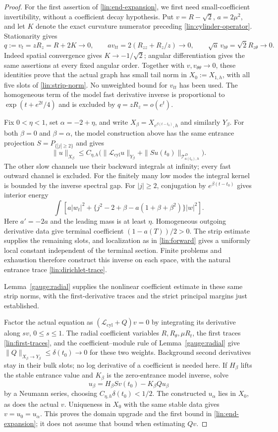 \begin{proof}
For the first assertion of \eqref{lin:end-expansion}, we first need
small-coefficient invertibility, without a coefficient decay hypothesis.
Put $v=R-\sqrt2$, $a=2\mu^2$, and let $K$ denote the exact curvature
numerator preceding \eqref{lin:cylinder-operator}.  Stationarity gives
\[
 q:=v_t=zR_z=R+2K\longrightarrow0,\qquad
 a v_{tt}=2(R_{zz}+R_z/z)\longrightarrow0,\qquad
 \sqrt a\,v_{t\theta}=\sqrt2R_{z\theta}\longrightarrow0.
\]
Indeed spatial convergence gives $K\to-1/\sqrt2$; angular
differentiation gives the same assertions at every fixed angular order.
Together with $v,v_{\theta\theta}\to0$, these identities prove that
the actual graph has small tail norm in $X_0:=X_{1,h}$, with all five
slots of \eqref{lin:strip-norm}.  No unweighted bound for $v_{tt}$
has been used.  The homogeneous term of the model fast derivative
inverse is proportional to $\exp(t+e^{2t}/4)$ and is excluded by
$q=zR_z=o(e^t)$.

Fix $0<\eta<1$, set $\alpha=-2+\eta$, and write
$X_\beta=X_{e^{\beta(t-t_0)},h}$ and similarly $Y_\beta$.
For both $\beta=0$ and $\beta=\alpha$, the model construction above
has the same entrance projection $S=P_{\{|j|\ge2\}}$ and gives
\[
 \|u\|_{X_\beta}\le C_{\eta,h}
 \bigl(\|\mathcal L_{\mathrm{cyl}}u\|_{Y_\beta}
       +\|Su(t_0)\|_{\mathcal T^D_{a(t_0),h}}\bigr).
\]
The other slow channels use their backward integrals at infinity;
every fast outward channel is excluded.  For the finitely many low
modes the integral kernel is bounded by the inverse spectral gap.
For $|j|\ge2$, conjugation by $e^{\beta(t-t_0)}$ gives interior energy
\[
 \int\!\left[a|w_t|^2+
 \{j^2-2+\beta-a(1+\beta+\beta^2)\}|w|^2\right].
\]
Here $a'=-2a$ and the leading mass is at least $\eta$.  Homogeneous
outgoing derivative data give terminal coefficient $(1-a(T))/2>0$.
The strip estimate supplies the remaining slots, and localization as
in \eqref{lin:forward} gives a uniformly local constant independent
of the terminal section.  Finite problems and exhaustion therefore
construct this inverse on each space, with the natural entrance trace
\eqref{lin:dirichlet-trace}.

Lemma~\ref{gauge:radial} supplies the nonlinear coefficient estimate
in these same strip norms, with the first-derivative traces and the
strict principal margins just established.

Factor the actual equation as $(\mathcal L_{\mathrm{cyl}}+Q)v=0$
by integrating its derivative along $sv$, $0\le s\le1$.
The radial coefficient variables $R,R_\theta,\mu R_t$, the first
traces \eqref{lin:first-traces}, and the coefficient--module rule
of Lemma~\ref{gauge:radial} give
$\|Q\|_{X_\beta\to Y_\beta}\le\delta(t_0)\to0$ for these two
weights.  Background second derivatives stay in their bulk slots;
no log derivative of a coefficient is needed here.
If $H_\beta$ lifts the stable entrance value and $K_\beta$ is the
zero-entrance model inverse, solve
\[
 u_\beta=H_\beta Sv(t_0)-K_\beta Q u_\beta
\]
by a Neumann series, choosing $C_{\eta,h}\delta(t_0)<1/2$.
The constructed $u_\alpha$ lies in $X_0$, as does the actual $v$.
Uniqueness in $X_0$ with the same stable data gives
$v=u_0=u_\alpha$.  This proves the domain upgrade and the first
bound in \eqref{lin:end-expansion}; it does not assume that bound
when estimating $Qv$.


\end{proof}
